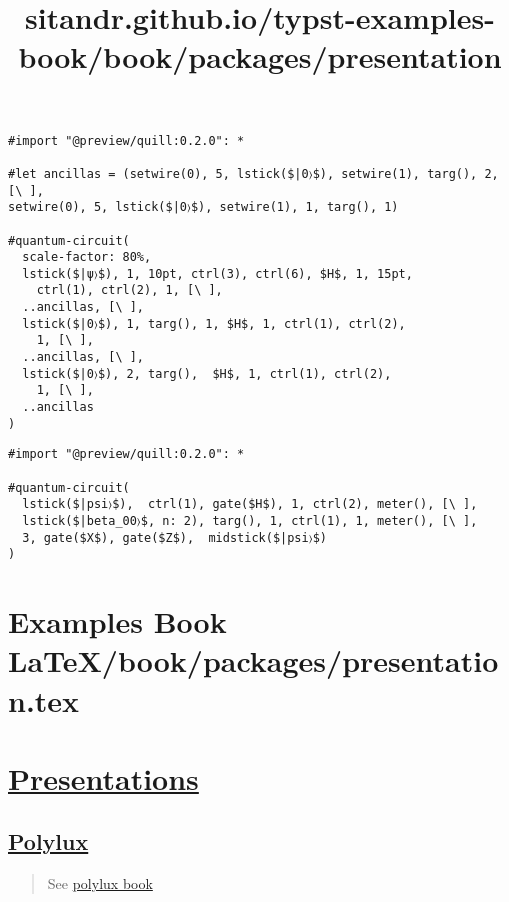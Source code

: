 \begin{verbatim}
#import "@preview/quill:0.2.0": *

#let ancillas = (setwire(0), 5, lstick($|0〉$), setwire(1), targ(), 2, [\ ],
setwire(0), 5, lstick($|0〉$), setwire(1), 1, targ(), 1)

#quantum-circuit(
  scale-factor: 80%,
  lstick($|ψ〉$), 1, 10pt, ctrl(3), ctrl(6), $H$, 1, 15pt, 
    ctrl(1), ctrl(2), 1, [\ ],
  ..ancillas, [\ ],
  lstick($|0〉$), 1, targ(), 1, $H$, 1, ctrl(1), ctrl(2), 
    1, [\ ],
  ..ancillas, [\ ],
  lstick($|0〉$), 2, targ(),  $H$, 1, ctrl(1), ctrl(2), 
    1, [\ ],
  ..ancillas
)
\end{verbatim}

\pandocbounded{}

\begin{verbatim}
#import "@preview/quill:0.2.0": *

#quantum-circuit(
  lstick($|psi〉$),  ctrl(1), gate($H$), 1, ctrl(2), meter(), [\ ],
  lstick($|beta_00〉$, n: 2), targ(), 1, ctrl(1), 1, meter(), [\ ],
  3, gate($X$), gate($Z$),  midstick($|psi〉$)
)
\end{verbatim}

\pandocbounded{}


\section{Examples Book LaTeX/book/packages/presentation.tex}
\title{sitandr.github.io/typst-examples-book/book/packages/presentation}

\section{\texorpdfstring{\hyperref[presentations]{Presentations}}{Presentations}}\label{presentations}

\subsection{\texorpdfstring{\hyperref[polylux]{Polylux}}{Polylux}}\label{polylux}

\begin{quote}
See \href{https://polylux.dev/book/}{polylux book}
\end{quote}

